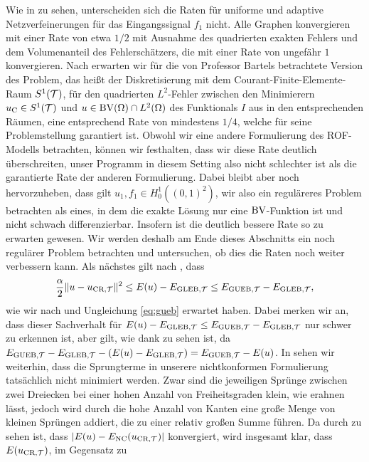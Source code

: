 Wie in  zu sehen, unterscheiden sich die Raten für
uniforme und adaptive Netzverfeinerungen für das Eingangssignal $f_1$ nicht.
Alle Graphen konvergieren mit einer Rate von etwa $1/2$ mit Ausnahme
des quadrierten exakten Fehlers und dem Volumenanteil des Fehlerschätzers,
die mit einer Rate von ungefähr $1$ konvergieren.
Nach \cite[S. 309, Theorem 10.7]{Bar15} erwarten wir für die von Professor
Bartels betrachtete Version des Problem, das heißt der Diskretisierung mit
dem Courant-Finite-Elemente-Raum $S^1(\mathcal{T})$, für den quadrierten $L^2$-Fehler
zwischen den Minimierern $u_{\textup{C}}\in S^1(\mathcal{T})$ und $u\in\textup{BV}(\Omega)\cap
L^2(\Omega)$ des Funktionals $I$ aus  in den entsprechenden
Räumen, eine entsprechend Rate von mindestens $1/4$, welche für seine
Problemstellung garantiert ist.
Obwohl wir eine andere Formulierung des ROF-Modells betrachten, können
wir festhalten, dass wir diese Rate deutlich überschreiten, unser 
Programm in diesem Setting also nicht schlechter ist als die garantierte 
Rate der anderen Formulierung.
Dabei bleibt aber noch hervorzuheben, dass gilt 
$u_1,f_1\in H^1_0\left( (0,1)^2 \right)$, wir also ein reguläreres Problem
betrachten als eines, in dem die exakte Lösung nur eine $\textup{BV}$-Funktion ist
und nicht schwach differenzierbar.
Insofern ist die deutlich bessere Rate so zu erwarten gewesen.
Wir werden deshalb am Ende dieses Abschnitts ein noch regulärer Problem
betrachten und untersuchen, ob dies die Raten noch weiter verbessern kann.
Als nächstes gilt nach , dass
\begin{align}
  \label{eq:expectedInequalities}
  \frac{\alpha}{2}\Vert u -u_{\textup{CR}, \mathcal{T}}\Vert^2
  \leq
  E(u)-E_{\textup{GLEB}, \mathcal{T}}
  \leq
  E_{\textup{GUEB}, \mathcal{T}}-E_{\textup{GLEB}, \mathcal{T}},
\end{align}
wie wir nach  und Ungleichung \ref{eq:gueb} erwartet haben.
Dabei merken wir an, dass dieser Sachverhalt für $E(u)-E_{\textup{GLEB}, \mathcal{T}}\leq E_{\textup{GUEB}, \mathcal{T}}-E_{\textup{GLEB}, \mathcal{T}}$
nur schwer zu erkennen ist, aber gilt, wie dank  zu
sehen ist, da $E_{\textup{GUEB}, \mathcal{T}}-E_{\textup{GLEB}, \mathcal{T}}-(E(u)-E_{\textup{GLEB}, \mathcal{T}}) = E_{\textup{GUEB}, \mathcal{T}}-E(u)$.
In  sehen wir weiterhin, dass die Sprungterme in
unserere nichtkonformen Formulierung tatsächlich nicht minimiert werden. 
Zwar sind die jeweiligen Sprünge zwischen zwei Dreiecken bei einer hohen Anzahl
von Freiheitsgraden klein, wie  erahnen lässt, jedoch
wird durch die hohe Anzahl von Kanten eine große Menge von kleinen Sprüngen
addiert, die zu einer relativ großen Summe führen.
Da durch  zu sehen ist, dass $|E(u)-E_\textup{NC}(u_{\textup{CR}, \mathcal{T}})|$
konvergiert, wird insgesamt klar, dass $E(u_{\textup{CR}, \mathcal{T}})$, im Gegensatz zu
